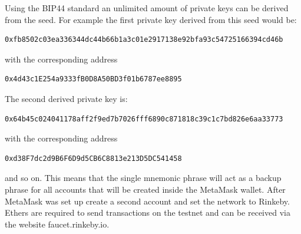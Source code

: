 Using the BIP44\cite{bip44} standard an unlimited amount of private keys can be derived from the seed.
For example the first private key derived from this seed would be:
\begin{lstlisting}[language=bash, numbers=none]
  0xfb8502c03ea336344dc44b66b1a3c01e2917138e92bfa93c54725166394cd46b
\end{lstlisting}
with the corresponding address
\begin{lstlisting}[language=bash, numbers=none]
  0x4d43c1E254a9333fB0D8A50BD3f01b6787ee8895
\end{lstlisting}
The second derived private key is:
\begin{lstlisting}[language=bash, numbers=none]
  0x64b45c024041178aff2f9ed7b7026fff6890c871818c39c1c7bd826e6aa33773
\end{lstlisting}
with the corresponding address
\begin{lstlisting}[language=bash, numbers=none]
  0xd38F7dc2d9B6F6D9d5CB6C8813e213D5DC541458
\end{lstlisting}
and so on.
This means that the single mnemonic phrase will act as a backup phrase for all accounts that will be created inside the MetaMask wallet.
After MetaMask was set up create a second account and set the network to Rinkeby.
Ethers are required to send transactions on the testnet and can be received via the website faucet.rinkeby.io.
\\

